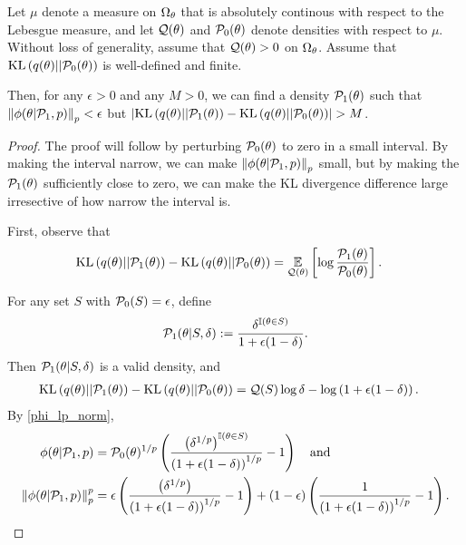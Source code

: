 \begin{thm}
%
Let $\mu$ denote a measure on $\Omega_{\theta}$ that is absolutely continous
with respect to the Lebesgue measure, and let $\mathcal{Q}(\theta)$ and
$\mathcal{P}_{0}(\theta)$ denote densities with respect to $\mu$.  Without loss of
generality, assume that $\mathcal{Q}(\theta) > 0$ on $\Omega_{\theta}$.  Assume that
$\mathrm{KL}\left(q(\theta) || \mathcal{P}_{0}(\theta)\right)$ is well-defined and finite.

Then, for any $\epsilon > 0$ and any $M > 0$, we can find a density
$\mathcal{P}_{1}(\theta)$ such that $\left\Vert\phi(\theta \vert \mathcal{P}_{1}, p)\right\Vert_p < \epsilon$ but
$\left|\mathrm{KL}\left(q(\theta) || \mathcal{P}_{1}(\theta)\right) - \mathrm{KL}\left(q(\theta) || \mathcal{P}_{0}(\theta)\right)\right| > M$.

\begin{proof}
%
The proof will follow by perturbing $\mathcal{P}_{0}(\theta)$ to zero in a small
interval.  By making the interval narrow, we can make $\left\Vert\phi(\theta \vert
\mathcal{P}_{1}, p)\right\Vert_p$ small, but by making the $\mathcal{P}_{1}(\theta)$ sufficiently close to
zero, we can make the KL divergence difference large irresective of how narrow
the interval is.

First, observe that
%
\begin{align*}
%
\KL{q(\theta) || \palt(\theta)} -
\KL{q(\theta) || \pbase(\theta)} ={}&
\expect{\q(\theta)}{\log \frac{\palt(\theta)}{\pbase(\theta)}}.
%
\end{align*}

For any set $S$ with $\mathcal{P}_{0}(S) = \epsilon$, define
%
\begin{align*}
%
\palt(\theta \vert S, \delta) :=
    \frac{\delta^{\ind{\theta \in S}}}{1 + \epsilon(1 - \delta)}.
%
\end{align*}
%
Then $\mathcal{P}_{1}(\theta \vert S, \delta)$ is a valid density, and
%
\begin{align*}
%
\KL{q(\theta) || \palt(\theta)} - \KL{q(\theta) || \pbase(\theta)}
    ={}& \q(S) \log \delta - \log\left( 1 + \epsilon(1 - \delta) \right).
%
\end{align*}
%
By \eqref{phi_lp_norm},
%
\begin{align*}
%
\phi(\theta \vert \palt, p) ={}&
    \pbase(\theta)^{1/p} \left(
        \frac{\left(\delta^{1/p}\right)^{\ind{\theta \in S}}}
             {\left( 1 + \epsilon(1 - \delta) \right)^{1/p}} - 1 \right) \mathand\\
\norm{\phi(\theta \vert \palt, p)}_p^p ={}&
\epsilon \left(
   \frac{\left(\delta^{1/p}\right)}
        {\left( 1 + \epsilon(1 - \delta) \right)^{1/p}} - 1 \right) +
(1 - \epsilon) \left(
   \frac{1}
        {\left( 1 + \epsilon(1 - \delta) \right)^{1/p}} - 1 \right).
%
\end{align*}


\end{proof}
\end{thm}
